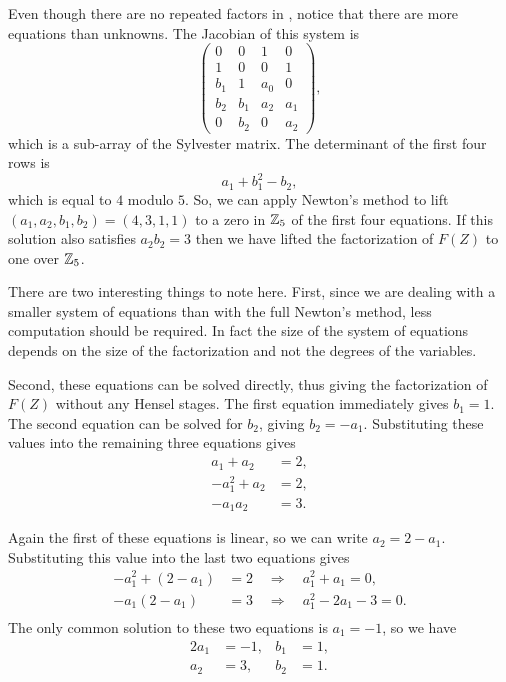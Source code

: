 Even though there are no repeated factors in ,
notice that there are more equations than unknowns.  The Jacobian of
this system is
\[
\left(
\begin{array}{cccc}
0 & 0 & 1 & 0 \\
1 & 0 & 0 & 1 \\
b_1 & 1 & a_0 & 0 \\
b_2 & b_1 & a_2 & a_1 \\
0 & b_2 & 0 & a_2 
\end{array}\right),
\]
which is a sub-array of the Sylvester matrix.  The determinant of the
first four rows is
\[
a_1 + b_1^2 - b_2,
\]
which is equal to $4$ modulo $5$.  So, we can apply Newton's method to 
lift $(a_1, a_2, b_1, b_2) = (4,3,1,1)$ to a zero in $\mathbb{Z}_5$ of the first 
four equations.  If this solution also satisfies $a_2 b_2 = 3$ then we 
have lifted the factorization of $F(Z)$ to one over $\mathbb{Z}_5$.

There are two interesting things to note here.  First, since we are
dealing with a smaller system of equations than with the full
Newton's method, less computation should be required.  In fact the
size of the system of equations depends on the size of the
factorization and not the degrees of the variables.

Second, these equations can be solved directly, thus giving the 
factorization of $F(Z)$ without any Hensel stages.  The first equation 
immediately gives $b_1 = 1$.  The second equation can be solved for 
$b_2$, giving $b_2 = - a_1$.  Substituting these values into the 
remaining three equations gives 
\[
\begin{aligned}
a_1 + a_2 & = 2, \\
-a_1^2 + a_2 &= 2, \\
-a_1 a_2 & = 3.
\end{aligned}
\]

Again the first of these equations is linear, so we can write $a_2 = 2
- a_1$.  Substituting this value into the last two equations gives
\[
\begin{aligned}
-a_1^2 + (2 - a_1) & = 2 \quad \Rightarrow \quad a_1^2 + a_1 = 0, \\
-a_1(2 - a_1) &= 3 \quad \Rightarrow \quad a_1^2 - 2a_1 - 3 = 0. \\
\end{aligned}
\]
The only common solution to these two equations is $a_1 = -1$, so we
have
\begin{alignat*}{2}
a_1 & = -1, & b_1 & = 1, \\
a_2 & = 3, & b_2 & = 1.
\end{alignat*}

